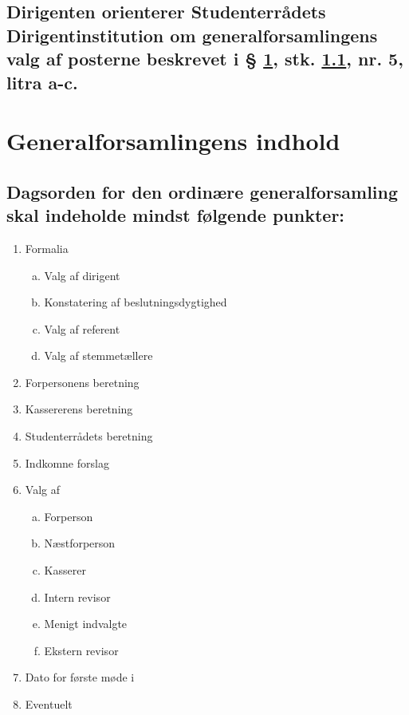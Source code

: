 \documentclass[10pt]{article}
\newcommand{\fagr}{\text{Fagrådet Sigma}}
\begin{document}
	\subsection{Dirigenten orienterer Studenterrådets Dirigentinstitution om generalforsamlingens valg af posterne beskrevet i § \ref{gfi}, stk. \ref{gfi:dagsorden}, nr. 5, litra a-c.}\label{gf:orienterer}
	
	\section{Generalforsamlingens indhold}\label{gfi}
	
	\subsection{Dagsorden for den ordinære generalforsamling skal indeholde mindst følgende punkter:}\label{gfi:dagsorden}
	
	\begin{enumerate}[1), nosep]
		\item Formalia
		
		\begin{enumerate}[a., nosep]
			\item Valg af dirigent
			\item Konstatering af beslutningsdygtighed
			\item Valg af referent
			\item Valg af stemmetællere
		\end{enumerate}
		\item Forpersonens beretning
		\item Kassererens beretning
		\item Studenterrådets beretning
		\item Indkomne forslag
		\item Valg af
		\begin{enumerate}[a., nosep]
			\item Forperson
			\item Næstforperson
			\item Kasserer
			\item Intern revisor
			\item Menigt indvalgte
			\item Ekstern revisor
		\end{enumerate}
		\item Dato for første møde i \fagr{}
		\item Eventuelt
	\end{enumerate}
	
\end{document}
